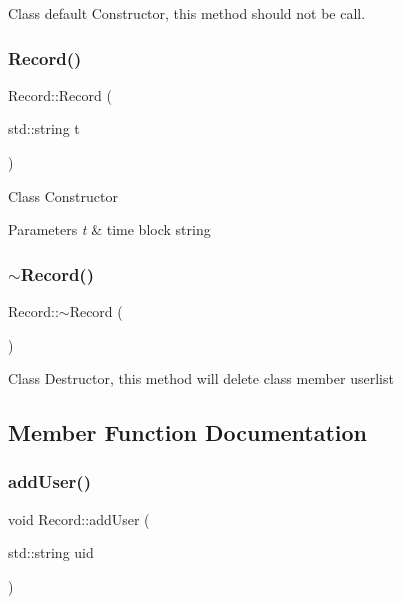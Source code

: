 Class default Constructor, this method should not be call. \mbox{\label{class_record_af1432c95bf127a6a3b202dcb5402397f}} 
\subsubsection{\texorpdfstring{Record()}{Record()}\hspace{0.1cm}{\footnotesize\ttfamily [2/2]}}
{\footnotesize\ttfamily Record\+::\+Record (\begin{DoxyParamCaption}\item[{std\+::string}]{t }\end{DoxyParamCaption})}

Class Constructor 
\begin{DoxyParams}{Parameters}
{\em t} & time block string \\
\hline
\end{DoxyParams}
\mbox{\label{class_record_ad2ce1a99d866834ab53dedd788cb1ea6}} 
\subsubsection{\texorpdfstring{$\sim$\+Record()}{~Record()}}
{\footnotesize\ttfamily Record\+::$\sim$\+Record (\begin{DoxyParamCaption}{ }\end{DoxyParamCaption})}

Class Destructor, this method will delete class member userlist 

\subsection{Member Function Documentation}
\mbox{\label{class_record_a3f5f6ec6daac3aa600385e14c583dc32}} 
\subsubsection{\texorpdfstring{add\+User()}{addUser()}}
{\footnotesize\ttfamily void Record\+::add\+User (\begin{DoxyParamCaption}\item[{std\+::string}]{uid }\end{DoxyParamCaption})}

